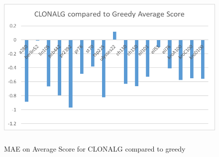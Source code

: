 \begin{figure}[H]
	\includegraphics[height=8cm, width=13cm]{Images/CLONALG_Fig_Avg2.png}
	\caption{MAE on Average Score for CLONALG compared to greedy}
	\label{CLONALG_Avg}
\end{figure}
